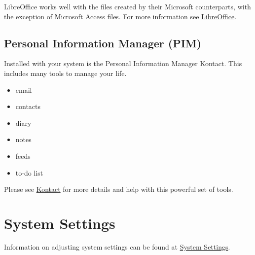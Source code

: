 \documentclass[letterpaper,10pt,english]{sphinxmanual}
\begin{document}
LibreOffice works well with the files created by their Microsoft counterparts, with the exception of Microsoft Access files. For more information see \href{https://wiki.ubuntu.com/LibreOffice}{LibreOffice}.


\subsection{Personal Information Manager (PIM)}
\label{\detokenize{docs/software:personal-information-manager-pim}}
Installed with your system is the  Personal Information Manager Kontact. This includes many tools to manage your life.
\begin{itemize}
\item {} 
email

\item {} 
contacts

\item {} 
diary

\item {} 
notes

\item {} 
feeds

\item {} 
to-do list

\end{itemize}

Please see \href{https://userbase.kde.org/Special:MyLanguage/Kontact}{Kontact} for more details and help with this powerful set of tools.


\section{System Settings}
\label{\detokenize{docs/software:system-settings}}
Information on adjusting system settings can be found at \href{https://userbase.kde.org/Special:MyLanguage/System\_Settings}{System Settings}.
\end{document}
